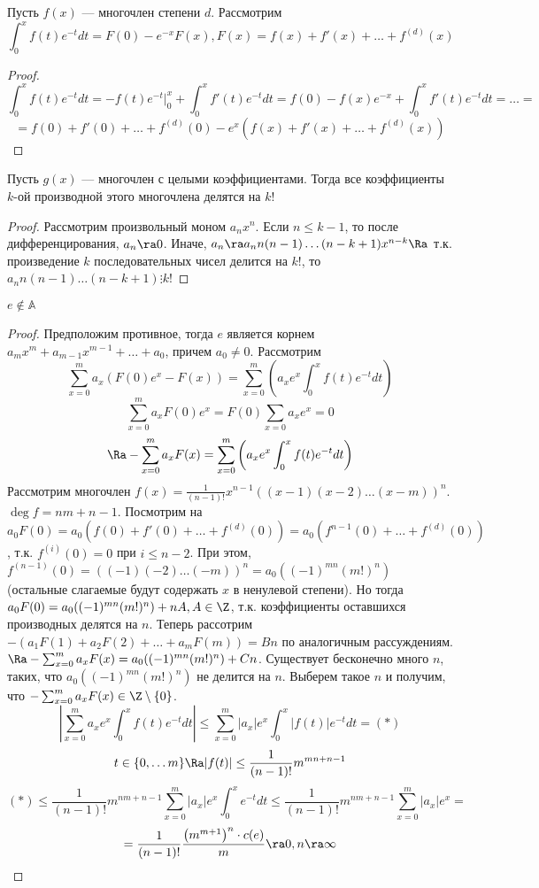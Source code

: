 \begin{proposition}
    Пусть \(f(x)\) --- многочлен степени \(d\).
    Рассмотрим
    \[\int_0^x f(t)e^{-t}dt = F(0) - e^{-x}F(x), F(x) = f(x) + f'(x) + \dots + f^{(d)}(x)\]
\end{proposition}
\begin{proof}
    \[\int_0^x f(t)e^{-t}dt = -f(t)e^{-t}|_0^x + \int_0^x f'(t)e^{-t}dt = f(0) - f(x)e^{-x} + \int_0^x f'(t)e^{-t}dt = \dots = \]
    \[= f(0) + f'(0) + \dots + f^{(d)}(0) - e^x(f(x) + f'(x) + \dots + f^{(d)}(x))\]
\end{proof}

\begin{proposition}
    Пусть \(g(x)\) --- многочлен с целыми коэффициентами. Тогда все коэффициенты \(k\)-ой производной этого многочлена делятся на \(k!\)
\end{proposition}
\begin{proof}
    Рассмотрим произвольный моном \(a_nx^n\). Если \(n \le k - 1\), то после дифференцирования, \(a_n \ra 0\). Иначе, \(a_n \ra a_nn(n - 1)\dots(n - k + 1)x^{n - k} \Ra\) т.к. произведение \(k\) последовательных чисел делится на \(k!\), то \(a_nn(n - 1)\dots(n - k + 1) \vdots k!\)
\end{proof}

\begin{theorem}
    \(e \notin \mathbb{A}\)
\end{theorem}
\begin{proof}
    Предположим противное, тогда \(e\) является корнем \(a_mx^m + a_{m - 1}x^{m - 1} + \dots + a_0\), причем \(a_0 \ne 0\).
    Рассмотрим 
    \[\sum_{x = 0}^m a_x(F(0)e^x - F(x)) = \sum_{x = 0}^m\left(a_xe^x\int_0^x f(t)e^{-t}dt\right)\]
    \[\sum_{x = 0}^ma_xF(0)e^x = F(0)\sum_{x = 0}a_xe^x = 0\]
    \[\Ra -\sum_{x = 0}^m a_xF(x) = \sum_{x = 0}^m\left(a_xe^x\int_0^xf(t)e^{-t}dt\right)\]
    Рассмотрим многочлен \(f(x) = \frac{1}{(n - 1)!}x^{n - 1}((x - 1)(x - 2)\dots(x - m))^n\). \(\deg f = nm + n - 1\). Посмотрим на \(a_0F(0) = a_0\left(f(0) + f'(0) + \dots + f^{(d)}(0)\right) = a_0\left(f^{n-1}(0) + \dots + f^{(d)}(0)\right)\), т.к. \(f^{(i)}(0) = 0\) при \(i \le n - 2\). При этом, \(f^{(n - 1)}(0) = ((-1)(-2)\dots(-m))^n = a_0((-1)^{mn} (m!)^n)\) (остальные слагаемые будут содержать \(x\) в ненулевой степени). Но тогда \(a_0F(0) = a_0((-1)^{mn} (m!)^n) + nA, A \in \Z\), т.к. коэффициенты оставшихся производных делятся на \(n\).
    Теперь рассотрим \(-(a_1F(1) + a_2F(2) + \dots + a_mF(m)) = Bn\) по аналогичным рассуждениям. \(\Ra -\sum_{x = 0}^m a_xF(x) = a_0((-1)^{mn} (m!)^n) + Cn\). Существует бесконечно много \(n\), таких, что \(a_0((-1)^{mn} (m!)^n)\) не делится на \(n\). Выберем такое \(n\) и получим, что \(-\sum_{x = 0}^m a_xF(x) \in \Z \setminus \{0\}\). 
    \[\left|\sum_{x = 0}^m a_xe^x\int_0^xf(t)e^{-t}dt\right| \le \sum_{x = 0}^m |a_x|e^x\int_0^x|f(t)|e^{-t}dt = (*)\]
    \[t \in \{0, \dots m\} \Ra |f(t)| \le \frac{1}{(n - 1)!}m^{mn + n - 1}\]
    \[(*) \le \frac{1}{(n - 1)!}m^{nm + n - 1}\sum_{x = 0}^m|a_x|e^x\int_0^xe^{-t}dt \le \frac{1}{(n - 1)!}m^{nm + n - 1}\sum_{x = 0}^m|a_x|e^x = \]
    \[ = \frac{1}{(n - 1)!}\frac{\left(m^{m + 1}\right)^n \cdot c(e)}{m} \ra 0, n \ra \infty\]
\end{proof}
